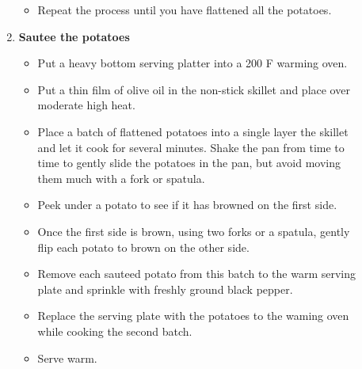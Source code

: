 \documentclass[11pt,letterpaper]{article}
\begin{document}
\begin{description}
\begin{enumerate}
\begin{itemize}
        \item Repeat the process until you have flattened all the potatoes.          
	\end{itemize}
	\item {\bf Sautee the potatoes}
	\begin{itemize}
        \item Put a heavy bottom serving platter into a 200 F warming oven.
	\item Put a thin film of olive oil in the non-stick skillet and place over moderate high heat.
	\item Place a batch of flattened potatoes into a single layer the skillet and let it cook for several minutes. Shake the pan from time to time to gently slide the potatoes in the pan, but avoid moving them much with a fork or spatula.
        \item Peek under a potato to see if it has browned on the first side.
        \item Once the first side is brown, using two forks or a spatula, gently flip each potato to brown on the other side. 
        \item Remove each sauteed potato from this batch to the warm serving plate and sprinkle with freshly ground black pepper.
        \item Replace the serving plate with the potatoes to the waming oven while cooking the second batch.
        \item Serve warm.
	\end{itemize}
	\end{enumerate}
\end{description}
\end{document}
